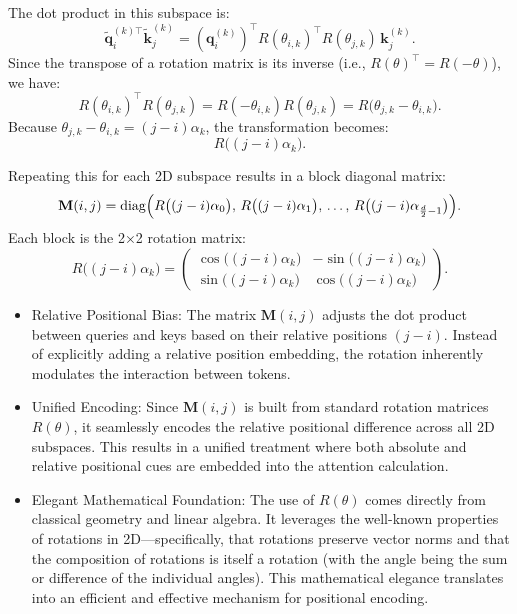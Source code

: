 The dot product in this subspace is:
\[
\tilde{\mathbf{q}}_i^{(k)\top} \tilde{\mathbf{k}}_j^{(k)} 
= \left(\mathbf{q}_i^{(k)}\right)^\top R(\theta_{i,k})^\top R(\theta_{j,k}) \, \mathbf{k}_j^{(k)}.
\]
Since the transpose of a rotation matrix is its inverse (i.e., \(R(\theta)^\top = R(-\theta)\)), we have:
\[
R(\theta_{i,k})^\top R(\theta_{j,k}) = R(-\theta_{i,k})R(\theta_{j,k}) = R\bigl(\theta_{j,k} - \theta_{i,k}\bigr).
\]
Because \(\theta_{j,k} - \theta_{i,k} = (j-i)\alpha_k\), the transformation becomes:
\[
R\bigl((j-i)\alpha_k\bigr).
\]

Repeating this for each 2D subspace results in a block diagonal matrix:
\[
\mathbf{M}(i,j) = \text{diag}\Bigl(
R\bigl((j-i)\alpha_0\bigr),\,
R\bigl((j-i)\alpha_1\bigr),\,
\ldots,\,
R\bigl((j-i)\alpha_{\frac{d}{2}-1}\bigr)
\Bigr).
\]
Each block is the 2×2 rotation matrix:
\[
R\bigl((j-i)\alpha_k\bigr)
= \begin{pmatrix}
\cos\bigl((j-i)\alpha_k\bigr) & -\sin\bigl((j-i)\alpha_k\bigr) \\
\sin\bigl((j-i)\alpha_k\bigr) & \cos\bigl((j-i)\alpha_k\bigr)
\end{pmatrix}.
\]

\begin{itemize}
	\item Relative Positional Bias:  
  The matrix \(\mathbf{M}(i,j)\) adjusts the dot product between queries and keys based on their relative positions \((j-i)\). Instead of explicitly adding a relative position embedding, the rotation inherently modulates the interaction between tokens.
	\item Unified Encoding: Since \(\mathbf{M}(i,j)\) is built from standard rotation matrices \(R(\theta)\), it seamlessly encodes the relative positional difference across all 2D subspaces. This results in a unified treatment where both absolute and relative positional cues are embedded into the attention calculation.
	\item Elegant Mathematical Foundation: The use of \(R(\theta)\) comes directly from classical geometry and linear algebra. It leverages the well-known properties of rotations in 2D—specifically, that rotations preserve vector norms and that the composition of rotations is itself a rotation (with the angle being the sum or difference of the individual angles). This mathematical elegance translates into an efficient and effective mechanism for positional encoding.
\end{itemize}

